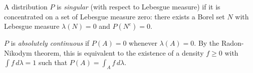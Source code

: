 A distribution $P$ is \textit{singular} (with respect to Lebesgue measure) if it is concentrated on a set of Lebesgue measure zero: there exists a Borel set $N$ with Lebesgue measure $\lambda(N) = 0$ and $P(N^c) = 0$.

$P$ is \textit{absolutely continuous} if $P(A) = 0$ whenever $\lambda(A) = 0$. By the Radon-Nikodym theorem, this is equivalent to the existence of a density $f \geq 0$ with $\int f \, d\lambda = 1$ such that $P(A) = \int_A f \, d\lambda$.
